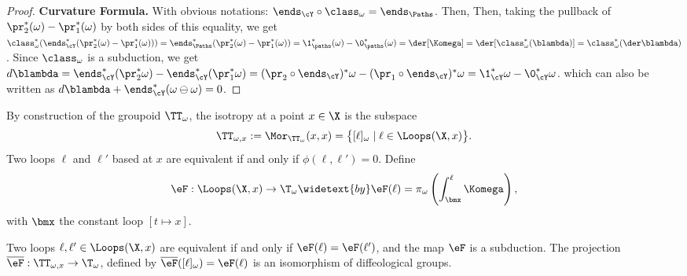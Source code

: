 \begin{proof}
    \textbf{Curvature Formula.}
    With obvious notations:
    $\ends_{\cY} \circ \class_\omega = \ends_{\Paths}$.
    Then,
    Then,
    taking the pullback of $\pr_2^*(\omega) - \pr_1^*(\omega)$ by both sides of this equality,
    we get $\class_\omega^*(\ends_{\cY}^*(\pr_2^*(\omega) - \pr_1^*(\omega)))
    = \ends_{\Paths}^*(\pr_2^*(\omega) - \pr_1^*(\omega))
    = \1_{\paths}^*(\omega) - \0_{\paths}^*(\omega)
    = \der[\Komega] = \der[\class_\omega^*(\blambda)]
    = \class_\omega^*(\der\blambda)$.
    Since $\class_\omega$ is a subduction,
    we get $d\blambda = \ends_{\cY}^*(\pr_2^*\omega) - \ends_{\cY}^*(\pr_1^*\omega) = (\pr_2 \circ \ends_{\cY})^*\omega - (\pr_1 \circ \ends_{\cY})^*\omega = \1_{\cY}^*\omega - \0_{\cY}^*\omega$.
    which can also be written as $d\blambda + \ends_{\cY}^*(\omega \ominus \omega) = 0$.
  \end{proof}
  
  
  \begin{article}
    \label{art: The Isotropy}
    
    By construction of the groupoid $\TT_\omega$,
    the isotropy at a point $x \in \X$ is the subspace
    $$
      \TT_{\omega,x} := \Mor_{\TT_\omega}(x,x) = \big\{ [\ell]_\omega \mid \ell \in \Loops(\X,x) \big\}.
      $$
    Two loops $\ell$ and $\ell'$ based at $x$ are equivalent if and only if $\phi(\ell,\ell') = 0$.
    Define
    $$
      \eF: \Loops(\X,x) \to \T_\omega \widetext{by} \eF(\ell) = \pi_\omega \left(\int_{\bmx}^\ell \Komega \right),
      $$
    with $\bmx$ the constant loop $[t \mapsto x]$.
    
    \begin{theorem}{}
      Two loops $\ell,\ell' \in \Loops(\X,x)$ are equivalent if and only if $\eF(\ell) = \eF(\ell')$,
      and the map $\eF$ is a subduction.
      The projection $\overline\eF : \TT_{\omega,x} \to \T_\omega$,
      defined by $\overline\eF([\ell]_\omega) = \eF(\ell)$ is an isomorphism of diffeological groups.
      \begin{center}
      \end{center}
    \end{theorem}
  \end{article}
  
